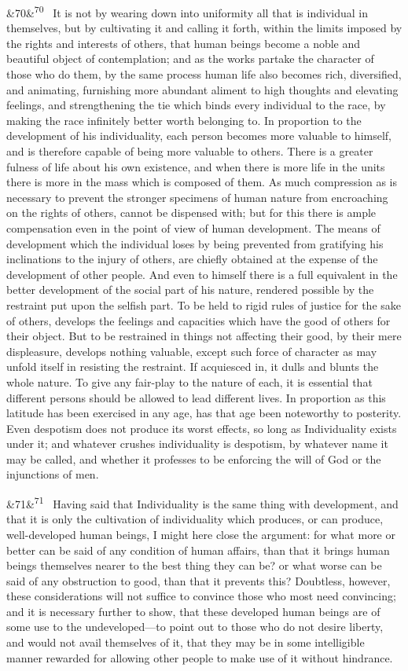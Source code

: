 \documentclass[12pt]{article}
\newcommand{\para}[1][]{\par\noindent\ifx&#1&\else\textsuperscript{\footnotesize #1}~\fi}
\begin{document}
\para[70] It is not by wearing down into uniformity all that is individual in themselves, but by cultivating it and calling it forth, within the limits imposed by the rights and interests of others, that human beings become a noble and beautiful object of contemplation; and as the works partake the character of those who do them, by the same process human life also becomes rich, diversified, and animating, furnishing more abundant aliment to high thoughts and elevating feelings, and strengthening the tie which binds every individual to the race, by making the race infinitely better worth belonging to. In proportion to the development of his individuality, each person becomes more valuable to himself, and is therefore capable of being more valuable to others. There is a greater fulness of life about his own existence, and when there is more life in the units there is more in the mass which is composed of them. As much compression as is necessary to prevent the stronger specimens of human nature from encroaching on the rights of others, cannot be dispensed with; but for this there is ample compensation even in the point of view of human development. The means of development which the individual loses by being prevented from gratifying his inclinations to the injury of others, are chiefly obtained at the expense of the development of other people. And even to himself there is a full equivalent in the better development of the social part of his nature, rendered possible by the restraint put upon the selfish part. To be held to rigid rules of justice for the sake of others, develops the feelings and capacities which have the good of others for their object. But to be restrained in things not affecting their good, by their mere displeasure, develops nothing valuable, except such force of character as may unfold itself in resisting the restraint. If acquiesced in, it dulls and blunts the whole nature. To give any fair-play to the nature of each, it is essential that different persons should be allowed to lead different lives. In proportion as this latitude has been exercised in any age, has that age been noteworthy to posterity. Even despotism does not produce its worst effects, so long as Individuality exists under it; and whatever crushes individuality is despotism, by whatever name it may be called, and whether it professes to be enforcing the will of God or the injunctions of men.

\para[71] Having said that Individuality is the same thing with development, and that it is only the cultivation of individuality which produces, or can produce, well-developed human beings, I might here close the argument: for what more or better can be said of any condition of human affairs, than that it brings human beings themselves nearer to the best thing they can be? or what worse can be said of any obstruction to good, than that it prevents this? Doubtless, however, these considerations will not suffice to convince those who most need convincing; and it is necessary further to show, that these developed human beings are of some use to the undeveloped---to point out to those who do not desire liberty, and would not avail themselves of it, that they may be in some intelligible manner rewarded for allowing other people to make use of it without hindrance.
\end{document}
